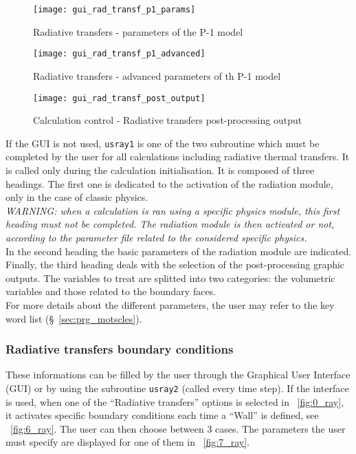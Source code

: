 {{\begin{figure}[ht]
\begin{center}
\texttt{[image: gui\_rad\_transf\_p1\_params]}
\caption{Radiative transfers - parameters of the P-1 model}
\label{fig:3_ray}
\end{center}
\end{figure}

\begin{figure}[ht]
\begin{center}
\texttt{[image: gui\_rad\_transf\_p1\_advanced]}
\caption{Radiative transfers - advanced parameters of th P-1 model}
\label{fig:4_ray}
\end{center}
\end{figure}

\begin{figure}[ht]
\begin{center}
\texttt{[image: gui\_rad\_transf\_post\_output]}
\caption{Calculation control - Radiative transfers post-processing output}
\label{fig:5_ray}
\end{center}
\end{figure}

If the GUI is not used, \texttt{usray1} is one of the two subroutine which must be completed by the user for all
calculations including radiative thermal transfers. It is called only during the calculation initialisation. It is composed of three headings. The first one is dedicated to the activation
of the radiation module, only in the case of classic physics. \\
{\em WARNING: when a calculation is ran using a specific physics module,
this first heading must not be completed. The radiation module is then
activated or not, according to the parameter file related to the considered
specific physics.} \\

\noindent
In the second heading the basic parameters of the radiation module are indicated.\\
Finally, the third heading deals with the selection of the
post-processing graphic outputs. The variables to treat are splitted
into two categories: the volumetric variables and those related to the
boundary faces.\\

\noindent
For more details about the different parameters, the user may refer to the
key word list (\S~\ref{sec:prg_motscles}).


\subsubsection{Radiative transfers boundary conditions}
These informations can be filled by the user through the Graphical User Interface (GUI) or by using the subroutine \texttt{usray2} (called every time step). If the interface is used, when one of the ``Radiative transfers'' options is selected in \figurename~\ref{fig:0_ray}, it activates specific boundary conditions each time a ``Wall'' is defined, see \figurename~\ref{fig:6_ray}. The user can then choose between 3 cases. The parameters the user must specify are displayed for one of them in \figurename~\ref{fig:7_ray}.

}}
